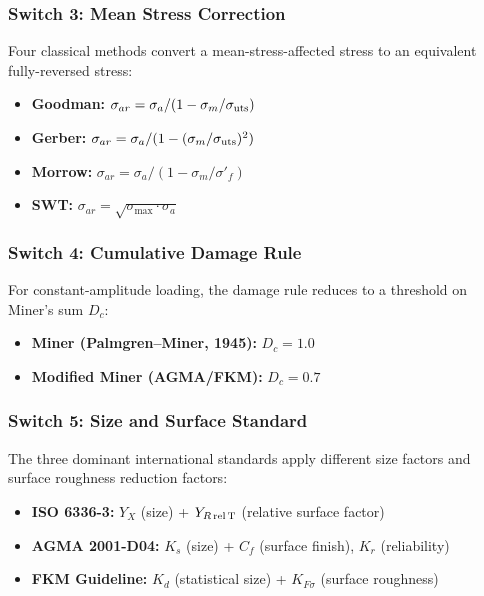 \documentclass[12pt,a4paper]{article}
\begin{document}
\subsubsection{Switch 3: Mean Stress Correction}

Four classical methods convert a mean-stress-affected stress to an
equivalent fully-reversed stress:

\begin{itemize}
  \item \textbf{Goodman:}
        $\sigma_{ar} = \sigma_a / (1 - \sigma_m/\sigma_{\rm uts})$
  \item \textbf{Gerber:}
        $\sigma_{ar} = \sigma_a / (1 - (\sigma_m/\sigma_{\rm uts})^2)$
  \item \textbf{Morrow:}
        $\sigma_{ar} = \sigma_a / (1 - \sigma_m/\sigma'_f)$
  \item \textbf{SWT:}
        $\sigma_{ar} = \sqrt{\sigma_{\max} \cdot \sigma_a}$
\end{itemize}

\subsubsection{Switch 4: Cumulative Damage Rule}

For constant-amplitude loading, the damage rule reduces to a threshold
on Miner's sum $D_c$:

\begin{itemize}
  \item \textbf{Miner (Palmgren--Miner, 1945):} $D_c = 1.0$
  \item \textbf{Modified Miner (AGMA/FKM):} $D_c = 0.7$
\end{itemize}

\subsubsection{Switch 5: Size and Surface Standard}

The three dominant international standards apply different size factors
and surface roughness reduction factors:

\begin{itemize}
  \item \textbf{ISO 6336-3:} $Y_X$ (size) + $Y_{R\,\rm rel\,T}$
        (relative surface factor)
  \item \textbf{AGMA 2001-D04:} $K_s$ (size) + $C_f$ (surface finish),
        $K_r$ (reliability)
  \item \textbf{FKM Guideline:} $K_d$ (statistical size) + $K_{F\sigma}$
        (surface roughness)
\end{itemize}
\end{document}
